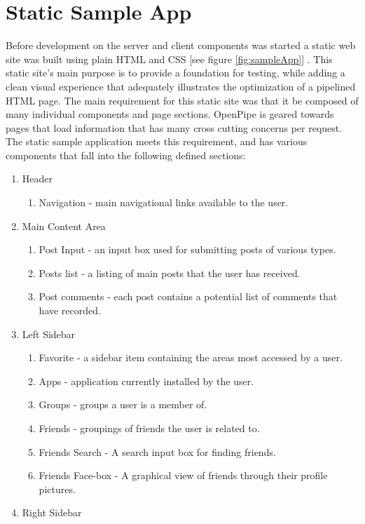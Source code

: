 \documentclass[12pt]{report}
\begin{document}
\section{Static Sample App}
Before development on the server and client components was started a static web site was built using plain HTML and CSS [see figure \ref{fig:sampleApp}] . This static site’s main purpose is to provide a foundation for testing, while adding a clean visual experience that adequately illustrates the optimization of a pipelined HTML page. The main requirement for this static site was that it be composed of many individual components and page sections. OpenPipe is geared towards pages that load information that has many cross cutting concerns per request. The static sample application meets this requirement, and has various components that fall into the following defined sections:

\begin{enumerate}
  \item Header
	\begin{enumerate}
		\item Navigation - main navigational links available to the user.
	\end{enumerate}
  \item Main Content Area
	\begin{enumerate}
		\item Post Input - an input box used for submitting posts of various types.
		\item Posts list - a listing of main posts that the user has received.
		\item Post comments - each post contains a potential list of comments that have recorded.
	\end{enumerate}
  \item Left Sidebar
	\begin{enumerate}
		\item Favorite - a sidebar item containing the areas most accessed by a user.
		\item Apps - application currently installed by the user.
		\item Groups - groups a user is a member of.
		\item Friends - groupings of friends the user is related to.
		\item Friends Search - A search input box for finding friends.
		\item Friends Face-box - A graphical view of friends through their profile pictures.
	\end{enumerate}
  \item Right Sidebar
\end{enumerate}
\end{document}
